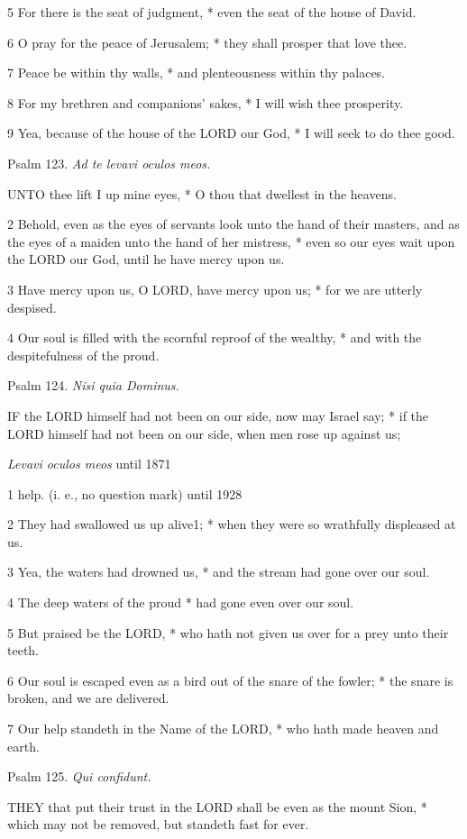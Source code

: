 5 For there is the seat of judgment, * even the seat
of the house of David.

6 O pray for the peace of Jerusalem; * they shall prosper
that love thee.

7 Peace be within thy walls, * and plenteousness within
thy palaces.

8 For my brethren and companions' sakes, * I will wish
thee prosperity.

9 Yea, because of the house of the LORD our God, *
I will seek to do thee good.

Psalm
123. \emph{Ad te levavi oculos meos.}

UNTO
thee lift I up mine eyes, * O thou that dwellest in the heavens.

2 Behold, even as the eyes of servants look unto the
hand of their masters, and as the eyes of a maiden unto the hand of her
mistress, * even so our eyes wait upon the LORD our God, until he have
mercy upon us.

3 Have mercy upon us, O LORD, have mercy upon us; *
for we are utterly despised.

4 Our soul is filled with the scornful reproof of the
wealthy, * and with the despitefulness of the proud.

Psalm
124. \emph{Nisi quia Dominus.}

IF
the LORD himself had not been on our side, now may Israel say; * if the
LORD himself had not been on our side, when men rose up against us;

\emph{Levavi oculos meos} until
1871

1 help. (i.
e., no question mark) until 1928

2 They
had swallowed us up alive1; * when they were so wrathfully
displeased at us.

3 Yea, the waters had drowned us, * and the stream
had gone over our soul.

4 The deep waters of the proud * had gone even over
our soul.

5 But praised be the LORD, * who hath not given us
over for a prey unto their teeth.

6 Our soul is escaped even as a bird out of the snare
of the fowler; * the snare is broken, and we are delivered.

7 Our help standeth in the Name of the LORD, * who
hath made heaven and earth.

Psalm
125. \emph{Qui confidunt.}

THEY
that put their trust in the LORD shall be even as the mount Sion, * which
may not be removed, but standeth fast for ever.

